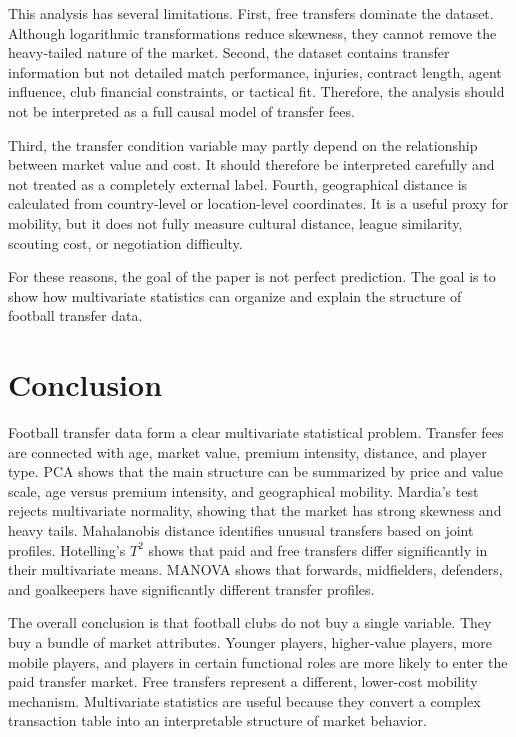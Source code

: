 \documentclass[12pt]{article}
\begin{document}
This analysis has several limitations. First, free transfers dominate the dataset. Although logarithmic transformations reduce skewness, they cannot remove the heavy-tailed nature of the market. Second, the dataset contains transfer information but not detailed match performance, injuries, contract length, agent influence, club financial constraints, or tactical fit. Therefore, the analysis should not be interpreted as a full causal model of transfer fees.

Third, the transfer condition variable may partly depend on the relationship between market value and cost. It should therefore be interpreted carefully and not treated as a completely external label. Fourth, geographical distance is calculated from country-level or location-level coordinates. It is a useful proxy for mobility, but it does not fully measure cultural distance, league similarity, scouting cost, or negotiation difficulty.

For these reasons, the goal of the paper is not perfect prediction. The goal is to show how multivariate statistics can organize and explain the structure of football transfer data.

\section{Conclusion}

Football transfer data form a clear multivariate statistical problem. Transfer fees are connected with age, market value, premium intensity, distance, and player type. PCA shows that the main structure can be summarized by price and value scale, age versus premium intensity, and geographical mobility. Mardia's test rejects multivariate normality, showing that the market has strong skewness and heavy tails. Mahalanobis distance identifies unusual transfers based on joint profiles. Hotelling's $T^2$ shows that paid and free transfers differ significantly in their multivariate means. MANOVA shows that forwards, midfielders, defenders, and goalkeepers have significantly different transfer profiles.

The overall conclusion is that football clubs do not buy a single variable. They buy a bundle of market attributes. Younger players, higher-value players, more mobile players, and players in certain functional roles are more likely to enter the paid transfer market. Free transfers represent a different, lower-cost mobility mechanism. Multivariate statistics are useful because they convert a complex transaction table into an interpretable structure of market behavior.
\end{document}
